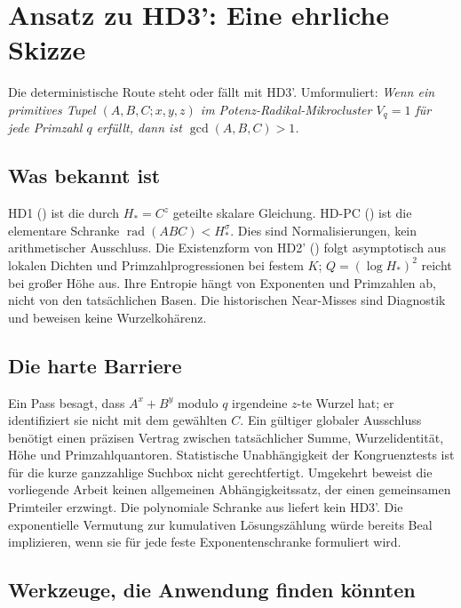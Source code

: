 \documentclass[11pt,a4paper]{article}
\DeclareMathOperator{\rad}{rad}
\begin{document}
\section{Ansatz zu HD3': Eine ehrliche Skizze}
\label{sec:hd3-approach}

Die deterministische Route steht oder fällt mit HD3'. Umformuliert: \emph{Wenn ein primitives Tupel $(A,B,C;x,y,z)$ im Potenz-Radikal-Mikrocluster $V_q = 1$ für jede Primzahl $q$ erfüllt, dann ist $\gcd(A,B,C) > 1$.}

\subsection*{Was bekannt ist}

HD1 () ist die durch $H_*=C^z$ geteilte skalare
Gleichung. HD-PC () ist die elementare
Schranke $\rad(ABC)<H_*^\sigma$. Dies sind Normalisierungen,
kein arithmetischer Ausschluss. Die Existenzform von HD2'
() folgt asymptotisch aus lokalen Dichten und
Primzahlprogressionen bei festem $K$; $Q=(\log H_*)^2$ reicht bei
großer Höhe aus. Ihre Entropie hängt von Exponenten und Primzahlen
ab, nicht von den tatsächlichen Basen. Die historischen Near-Misses
sind Diagnostik und beweisen keine Wurzelkohärenz.

\subsection*{Die harte Barriere}

Ein Pass besagt, dass $A^x+B^y$ modulo $q$ irgendeine $z$-te
Wurzel hat; er identifiziert sie nicht mit dem gewählten $C$.
Ein gültiger globaler Ausschluss benötigt einen präzisen Vertrag
zwischen tatsächlicher Summe, Wurzelidentität, Höhe und Primzahlquantoren.
Statistische Unabhängigkeit der Kongruenztests ist für die kurze
ganzzahlige Suchbox nicht gerechtfertigt. Umgekehrt beweist die
vorliegende Arbeit keinen allgemeinen Abhängigkeitssatz, der einen gemeinsamen
Primteiler erzwingt. Die polynomiale Schranke aus 
liefert kein HD3'. Die exponentielle Vermutung zur kumulativen
Lösungszählung  würde bereits Beal implizieren,
wenn sie für jede feste Exponentenschranke formuliert wird.

\subsection*{Werkzeuge, die Anwendung finden könnten}
\end{document}
